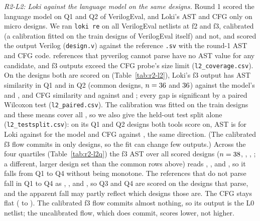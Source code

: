 \documentclass[conference]{IEEEtran}
\newcommand{\code}[1]{\texttt{#1}}
\begin{document}
\emph{R2-L2: Loki against the language model on the same designs.} Round 1 scored the
language model on Q1 and Q2 of VerilogEval, and Loki's AST and CFG only on micro designs. We
ran \code{loki re} on all \rtLtwoDesigns{} VerilogEval netlists at f2 and f3, calibrated (a calibration
fitted on the \rtLtwoTrainDesigns{} train designs of VerilogEval itself) and not, and scored the output Verilog
(\code{design.v}) against the reference \code{.sv} with the round-1 AST and CFG code.
\rtLtwoRefAstFail{} references that pyverilog cannot parse have no AST value for any
candidate, and \rtLtwoCfgSkip{} f3 outputs exceed the CFG probe's size limit
(\code{l2\_coverage.csv}). On the designs both are scored on (Table~\ref{tab:r2-l2}), Loki's
f3 output has AST similarity \rtLtwoLokiAstQa{} in Q1 and \rtLtwoLokiAstQb{} in Q2 (common
designs, $n=36{}$ and $36{}$) against the model's \rtLtwoLlmAstQa{} and \rtLtwoLlmAstQb{}, and CFG similarity
\rtLtwoLokiCfgQa{} and \rtLtwoLokiCfgQb{} against \rtLtwoLlmCfgQa{} and \rtLtwoLlmCfgQb{};
every gap is significant by a paired Wilcoxon test (\code{l2\_paired.csv}). The calibration
was fitted on the train designs and these means cover all \rtLtwoDesigns{}, so we also give the held-out
test split alone (\code{l2\_testsplit.csv}): on its \rtLtwoTestN{} Q1 and Q2 designs both
tools score on, AST is \rtLtwoTestLokiAst{} for Loki against \rtLtwoTestLlmAst{} for the model
and CFG \rtLtwoTestLokiCfg{} against \rtLtwoTestLlmCfg{}, the same direction. (The calibrated
f3 flow commits in only \rtLtwoCommitDesigns{} designs, so the fit can change few outputs.) Across the four
quartiles (Table~\ref{tab:r2-l2q}) the f3 AST over all scored designs ($n=38{}$, \rtLtwoTrendNQb{}, \rtLtwoTrendNQc{}, \rtLtwoTrendNQd{}; a different, larger
design set than the common rows above) reads \rtLtwoTrendAstQa{}, \rtLtwoTrendAstQb{},
\rtLtwoTrendAstQc{} and \rtLtwoTrendAstQd{}, so it falls from Q1 to Q4 without being monotone. The \rtLtwoRefAstFail{} references that
do not parse fall in Q1 to Q4 as \rtLtwoRefFailQa{}, \rtLtwoRefFailQb{}, \rtLtwoRefFailQc{} and
\rtLtwoRefFailQd{}, so Q3 and Q4 are scored on the designs that parse, and the apparent fall
may partly reflect which designs those are. The CFG stays flat (\rtLtwoTrendCfgQa{} to \rtLtwoTrendCfgQd{}). The calibrated f3 flow
commits almost nothing, so its output is the L0 netlist; the uncalibrated flow, which does
commit, scores lower, not higher.
\end{document}
